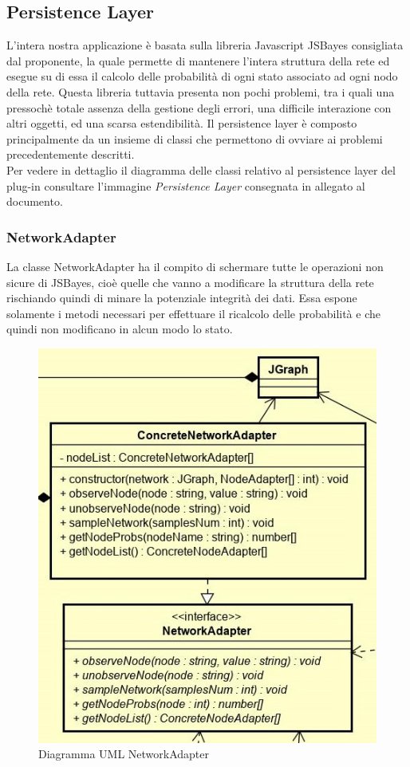\subsection{Persistence Layer}
L'intera nostra applicazione è basata sulla libreria Javascript JSBayes consigliata dal proponente, la quale permette di mantenere l'intera struttura della rete ed esegue su di essa il calcolo delle probabilità di ogni stato associato ad ogni nodo della rete.
Questa libreria tuttavia presenta non pochi problemi, tra i quali una pressochè totale assenza della gestione degli errori, una difficile interazione con altri oggetti, ed una scarsa estendibilità.
Il persistence layer è composto principalmente da un insieme di classi che permettono di ovviare ai problemi precedentemente descritti. \\

Per vedere in dettaglio il diagramma delle classi relativo al persistence layer del plug-in consultare l'immagine \emph{Persistence Layer} consegnata in allegato al documento.

\subsubsection{NetworkAdapter}
La classe NetworkAdapter ha il compito di schermare tutte le operazioni non sicure di JSBayes, cioè quelle che vanno a modificare la struttura della rete rischiando quindi di minare la potenziale integrità dei dati.
Essa espone solamente i metodi necessari per effettuare il ricalcolo delle probabilità e che quindi non modificano in alcun modo lo stato.
\begin{figure} [H]
	\centering
	\includegraphics[scale=0.7]{Img/NetworkAdapter2}
	\caption{Diagramma UML NetworkAdapter}\label{}
\end{figure}
